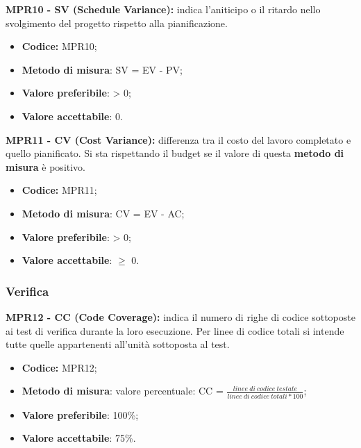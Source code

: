 \textbf{MPR10 - SV (Schedule Variance):} indica l'aniticipo o il ritardo nello svolgimento del progetto rispetto alla pianificazione.
\begin{itemize}
    \item \textbf{Codice:} MPR10;
    \item \textbf{Metodo di misura}: SV = EV - PV;
    \item \textbf{Valore preferibile}: > 0;
    \item \textbf{Valore accettabile}: 0.
\end{itemize}
\textbf{MPR11 - CV (Cost Variance):} differenza tra il costo del lavoro completato e quello pianificato. Si sta rispettando il budget se il valore di questa \textbf{metodo di misura} 
è positivo.
\begin{itemize}
    \item \textbf{Codice:} MPR11;
    \item \textbf{Metodo di misura}: CV = EV - AC;
    \item \textbf{Valore preferibile}: > 0;
    \item \textbf{Valore accettabile}: $\geq$ 0.
\end{itemize}
\subsubsection{Verifica}
\textbf{MPR12 - CC (Code Coverage):} indica il numero di righe di codice sottoposte ai test di verifica durante la loro esecuzione. Per linee di codice totali 
si intende tutte quelle appartenenti all'unità sottoposta al test.
\begin{itemize}
    \item \textbf{Codice:} MPR12;
    \item \textbf{Metodo di misura}: valore percentuale: CC = $\frac{linee \ di \ codice \ testate}{linee \ di \ codice \ totali * 100}$;
    \item \textbf{Valore preferibile}: 100\%;
    \item \textbf{Valore accettabile}: 75\%.
\end{itemize}
